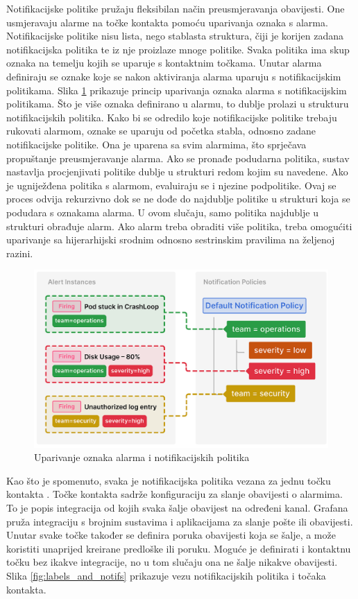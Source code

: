 Notifikacijske politike pružaju fleksibilan način preusmjeravanja obavijesti. One usmjeravaju alarme na točke kontakta pomoću uparivanja oznaka  s alarma. Notifikacijske politike nisu lista, nego stablasta struktura, čiji je korijen zadana notifikacijska politika te iz nje proizlaze mnoge politike. Svaka politika ima skup oznaka na temelju kojih se uparuje s kontaktnim točkama. Unutar alarma definiraju se oznake koje se nakon aktiviranja alarma uparuju s notifikacijskim politikama. Slika \ref{fig:label_matching} prikazuje princip uparivanja oznaka alarma s notifikacijskim politikama. Što je više oznaka definirano u alarmu, to dublje prolazi u strukturu notifikacijskih politika. Kako bi se odredilo koje notifikacijske politike trebaju rukovati alarmom, oznake se uparuju od početka stabla, odnosno zadane notifikacijske politike. Ona je uparena sa svim alarmima, što sprječava propuštanje preusmjeravanje alarma. Ako se pronađe podudarna politika, sustav nastavlja procjenjivati politike dublje u strukturi redom kojim su navedene. Ako je ugniježđena politika s alarmom, evaluiraju se i njezine podpolitike. Ovaj se proces odvija rekurzivno dok se ne dođe do najdublje politike u strukturi koja se podudara s oznakama alarma. U ovom slučaju, samo politika najdublje u strukturi obrađuje alarm. Ako alarm treba obraditi više politika, treba omogućiti uparivanje sa hijerarhijski srodnim odnosno sestrinskim pravilima na željenoj razini.  

\begin{figure}[ht]
	\centering
	\includegraphics[scale=0.4]{imgs/label_matching}
	\caption{Uparivanje oznaka alarma i notifikacijskih politika \cite{grafana}}
	\label{fig:label_matching}
\end{figure}

Kao što je spomenuto, svaka je notifikacijska politika vezana za jednu točku kontakta . Točke kontakta sadrže konfiguraciju za slanje obavijesti o alarmima. To je popis integracija od kojih svaka šalje obavijest na određeni kanal. Grafana pruža integraciju s brojnim sustavima i aplikacijama za slanje pošte ili obavijesti. Unutar svake točke također se definira poruka obavijesti koja se šalje, a može koristiti unaprijed kreirane predloške ili poruku. Moguće je definirati i kontaktnu točku bez ikakve integracije, no u tom slučaju ona ne šalje nikakve obavijesti. Slika \ref{fig:labels_and_notifs} prikazuje vezu notifikacijskih politika i točaka kontakta.

